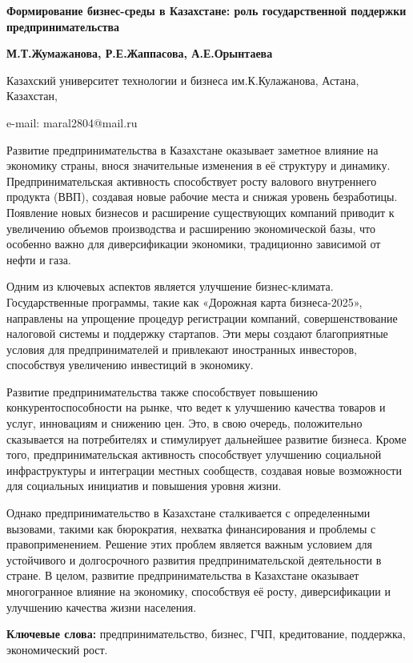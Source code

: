 {\bfseries Формирование бизнес-среды в Казахстане: роль государственной
поддержки предпринимательства}

{\bfseries М.Т.Жумажанова\textsuperscript{\envelope }, Р.Е.Жаппасова, А.Е.Орынтаева}

Казахский университет технологии и бизнеса им.К.Кулажанова, Астана,
Казахстан,

e-mail: maral2804@mail.ru

Развитие предпринимательства в Казахстане оказывает заметное влияние на
экономику страны, внося значительные изменения в её структуру и
динамику. Предпринимательская активность способствует росту валового
внутреннего продукта (ВВП), создавая новые рабочие места и снижая
уровень безработицы. Появление новых бизнесов и расширение существующих
компаний приводит к увеличению объемов производства и расширению
экономической базы, что особенно важно для диверсификации экономики,
традиционно зависимой от нефти и газа.

Одним из ключевых аспектов является улучшение бизнес-климата.
Государственные программы, такие как «Дорожная карта бизнеса-2025»,
направлены на упрощение процедур регистрации компаний, совершенствование
налоговой системы и поддержку стартапов. Эти меры создают благоприятные
условия для предпринимателей и привлекают иностранных инвесторов,
способствуя увеличению инвестиций в экономику.

Развитие предпринимательства также способствует повышению
конкурентоспособности на рынке, что ведет к улучшению качества товаров и
услуг, инновациям и снижению цен. Это, в свою очередь, положительно
сказывается на потребителях и стимулирует дальнейшее развитие бизнеса.
Кроме того, предпринимательская активность способствует улучшению
социальной инфраструктуры и интеграции местных сообществ, создавая новые
возможности для социальных инициатив и повышения уровня жизни.

Однако предпринимательство в Казахстане сталкивается с определенными
вызовами, такими как бюрократия, нехватка финансирования и проблемы с
правоприменением. Решение этих проблем является важным условием для
устойчивого и долгосрочного развития предпринимательской деятельности в
стране. В целом, развитие предпринимательства в Казахстане оказывает
многогранное влияние на экономику, способствуя её росту, диверсификации
и улучшению качества жизни населения.

{\bfseries Ключевые слова:} предпринимательство, бизнес, ГЧП, кредитование,
поддержка, экономический рост.

